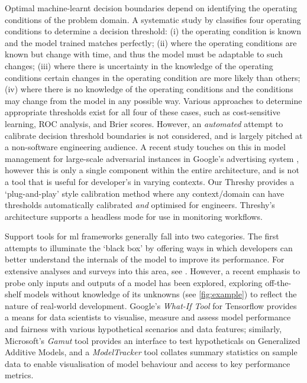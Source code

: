 
Optimal machine-learnt decision boundaries depend on identifying the operating conditions of the problem domain. A systematic study by \citet{Drummond2006} classifies four operating conditions to determine a decision threshold: (i) the operating condition is known and the model trained matches perfectly; (ii) where the operating conditions are known but change with time, and thus the model must be adaptable to such changes; (iii) where there is uncertainty in the knowledge of the operating conditions certain changes in the operating condition are more likely than others; (iv) where there is no knowledge of the operating conditions and the conditions may change from the model in any possible way. Various approaches to determine appropriate thresholds exist for all four of these cases, such as cost-sensitive learning, ROC analysis, and Brier scores. However, an \textit{automated} attempt to calibrate decision threshold boundaries is not considered, and is largely pitched at a non-software engineering audience. A recent study touches on this in model management for large-scale adversarial instances in Google's advertising system \citep{sculley2011detecting}, however this is only a single component within the entire architecture, and is not a tool that is useful for developer's in varying contexts. Our Threshy provides a `plug-and-play' style calibration method where any context/domain can have thresholds automatically calibrated \textit{and} optimised for engineers. Threshy’s architecture supports a headless mode for use in monitoring workflows.


Support tools for \gls{ml} frameworks generally fall into two categories. The first attempts to illuminate the `black box' by offering ways in which developers can better understand the internals of the model to improve its performance. For extensive analyses and surveys into this area, see \citep{Hohman2018VisualAI,Patel:2008:ISM:1357054.1357160}. However, a recent emphasis to probe only inputs and outputs of a model has been explored, exploring off-the-shelf models without  knowledge of its unknowns (see \cref{fig:example}) to reflect the nature of real-world development. Google's \textit{What-If Tool} \citep{DBLP:journals/corr/abs-1907-04135} for Tensorflow provides a means for data scientists to visualise, measure and assess model performance and fairness with various hypothetical scenarios and data features; similarly, Microsoft's \textit{Gamut} tool  \citep{hohman2019gamut} provides an interface to test hypotheticals on Generalized Additive Models, and a  \textit{ModelTracker} tool \citep{amershi2015modeltracker} collates summary statistics on sample data to enable visualisation of model behaviour and access to key performance metrics.

